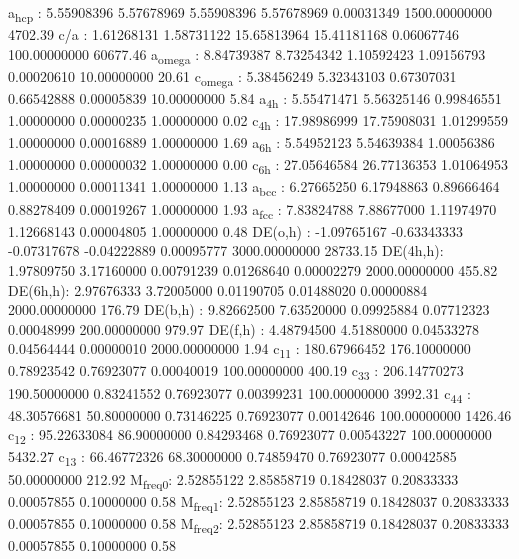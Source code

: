 \documentclass[11pt]{article}
\begin{document}
a\textsubscript{hcp}   :   5.55908396   5.57678969   5.55908396   5.57678969   0.00031349 1500.00000000      4702.39
c/a     :   1.61268131   1.58731122  15.65813964  15.41181168   0.06067746 100.00000000     60677.46
a\textsubscript{omega} :   8.84739387   8.73254342   1.10592423   1.09156793   0.00020610  10.00000000        20.61
c\textsubscript{omega} :   5.38456249   5.32343103   0.67307031   0.66542888   0.00005839  10.00000000         5.84
a\textsubscript{4h}    :   5.55471471   5.56325146   0.99846551   1.00000000   0.00000235   1.00000000         0.02
c\textsubscript{4h}    :  17.98986999  17.75908031   1.01299559   1.00000000   0.00016889   1.00000000         1.69
a\textsubscript{6h}    :   5.54952123   5.54639384   1.00056386   1.00000000   0.00000032   1.00000000         0.00
c\textsubscript{6h}    :  27.05646584  26.77136353   1.01064953   1.00000000   0.00011341   1.00000000         1.13
a\textsubscript{bcc}   :   6.27665250   6.17948863   0.89666464   0.88278409   0.00019267   1.00000000         1.93
a\textsubscript{fcc}   :   7.83824788   7.88677000   1.11974970   1.12668143   0.00004805   1.00000000         0.48
DE(o,h) :  -1.09765167  -0.63343333  -0.07317678  -0.04222889   0.00095777 3000.00000000     28733.15
DE(4h,h):   1.97809750   3.17160000   0.00791239   0.01268640   0.00002279 2000.00000000       455.82
DE(6h,h):   2.97676333   3.72005000   0.01190705   0.01488020   0.00000884 2000.00000000       176.79
DE(b,h) :   9.82662500   7.63520000   0.09925884   0.07712323   0.00048999 200.00000000       979.97
DE(f,h) :   4.48794500   4.51880000   0.04533278   0.04564444   0.00000010 2000.00000000         1.94
c\textsubscript{11}    : 180.67966452 176.10000000   0.78923542   0.76923077   0.00040019 100.00000000       400.19
c\textsubscript{33}    : 206.14770273 190.50000000   0.83241552   0.76923077   0.00399231 100.00000000      3992.31
c\textsubscript{44}    :  48.30576681  50.80000000   0.73146225   0.76923077   0.00142646 100.00000000      1426.46
c\textsubscript{12}    :  95.22633084  86.90000000   0.84293468   0.76923077   0.00543227 100.00000000      5432.27
c\textsubscript{13}    :  66.46772326  68.30000000   0.74859470   0.76923077   0.00042585  50.00000000       212.92
M\textsubscript{freq}\textsubscript{0}:   2.52855122   2.85858719   0.18428037   0.20833333   0.00057855   0.10000000         0.58
M\textsubscript{freq}\textsubscript{1}:   2.52855123   2.85858719   0.18428037   0.20833333   0.00057855   0.10000000         0.58
M\textsubscript{freq}\textsubscript{2}:   2.52855123   2.85858719   0.18428037   0.20833333   0.00057855   0.10000000         0.58
\end{document}
